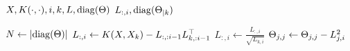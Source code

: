 \begin{algorithmic}[1]
  \REQUIRE \( X, K(\cdot, \cdot), i, k, L, \operatorname{diag}(\Theta) \)
  \ENSURE \( L_{:, i}, \operatorname{diag}(\Theta_{\mid k}) \)

  \STATE \( N \gets \lvert\operatorname{diag}(\Theta)\rvert \)
  \STATE \(
    L_{:, i} \gets
    K(X, X_k) - L_{:, :i - 1} L_{k, :i - 1}^{\top}
  \)
  \STATE \( L_{:, i} \gets \frac{L_{:, i}}{\sqrt{L_{k, i}}} \)
    \STATE \( \Theta_{j, j} \gets \Theta_{j, j} - L_{j, i}^2 \)
  \ENDFOR
\end{algorithmic}
